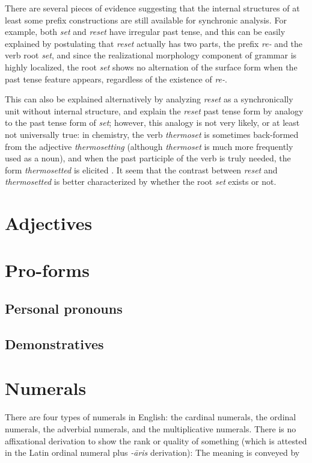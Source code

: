 \documentclass[UTF8, a4paper, oneside, scheme=plain, 12pt]{ctexbook}
\newcommand{\form}[1]{\emph{#1}}
\begin{document}
There are several pieces of evidence suggesting that 
the internal structures of at least some prefix constructions 
are still available for synchronic analysis.
For example, both \form{set} and \form{reset} have irregular past tense, 
and this can be easily explained by postulating that 
\form{reset} actually has two parts, 
the prefix \form{re-} and the verb root \form{set},
and since the realizational morphology component of grammar is highly localized, 
the root \form{set} shows no alternation of the surface form 
when the past tense feature appears,
regardless of the existence of \form{re-}. 

This can also be explained alternatively by analyzing \form{reset} 
as a synchronically unit without internal structure, 
and explain the \form{reset} past tense form 
by analogy to the past tense form of \form{set};
however, this analogy is not very likely,  
or at least not universally true:
in chemistry,
the verb \form{thermoset} is sometimes back-formed from the adjective \form{thermosetting} 
(although \form{thermoset} is much more frequently used as a noun),
and when the past participle of the verb is truly needed, 
the form \form{thermosetted} is elicited 
\citep{d2021chemical}.
It seem that the contrast between \form{reset} and \form{thermosetted} 
is better characterized by whether the root \form{set} exists or not. 

\section{Adjectives}


\section{Pro-forms}

\subsection{Personal pronouns}

\subsection{Demonstratives}

\section{Numerals}

There are four types of numerals in English:
the cardinal numerals, 
the ordinal numerals,
the adverbial numerals,
and the multiplicative numerals.
There is no affixational derivation to show the rank or quality of something 
(which is attested in the Latin ordinal numeral plus \form{-āris} derivation):
The meaning is conveyed by 
\end{document}
